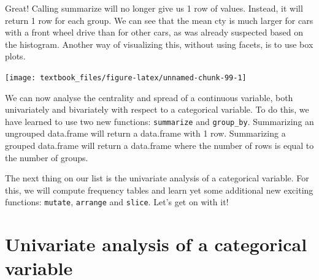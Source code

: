 \documentclass[]{tufte-book}
\newenvironment{Shaded}{}{}
\newcommand{\DataTypeTok}[1]{\textcolor[rgb]{0.56,0.13,0.00}{#1}}
\newcommand{\DecValTok}[1]{\textcolor[rgb]{0.25,0.63,0.44}{#1}}
\newcommand{\FloatTok}[1]{\textcolor[rgb]{0.25,0.63,0.44}{#1}}
\newcommand{\KeywordTok}[1]{\textcolor[rgb]{0.00,0.44,0.13}{\textbf{#1}}}
\newcommand{\NormalTok}[1]{#1}
\newcommand{\OperatorTok}[1]{\textcolor[rgb]{0.40,0.40,0.40}{#1}}
\newcommand{\StringTok}[1]{\textcolor[rgb]{0.25,0.44,0.63}{#1}}
\begin{document}
Great! Calling summarize will no longer give us 1 row of values. Instead, it will return 1 row for each group. We can see that the mean cty is much larger for cars with a front wheel drive than for other cars, as was already suspected based on the histogram. Another way of visualizing this, without using facets, is to use box plots.

\begin{Shaded}
\end{Shaded}

\texttt{[image: textbook\_files/figure-latex/unnamed-chunk-99-1]}

We can now analyse the centrality and spread of a continuous variable, both univariately and bivariately with respect to a categorical variable. To do this, we have learned to use two new functions: \texttt{summarize} and \texttt{group\_by}. Summarizing an ungrouped data.frame will return a data.frame with 1 row. Summarizing a grouped data.frame will return a data.frame where the number of rows is equal to the number of groups.

The next thing on our list is the univariate analysis of a categorical variable. For this, we will compute frequency tables and learn yet some additional new exciting functions: \texttt{mutate}, \texttt{arrange} and \texttt{slice}. Let's get on with it!

\hypertarget{univariate-analysis-of-a-categorical-variable}{%
\section{Univariate analysis of a categorical variable}\label{univariate-analysis-of-a-categorical-variable}}
\end{document}
